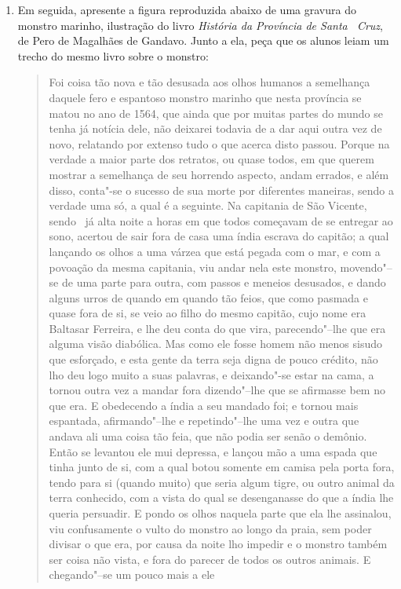 \documentclass[12pt]{extarticle}
\begin{document}
{\begin{enumerate}
\item Em seguida, apresente a figura reproduzida abaixo de uma gravura do 
monstro marinho, ilustração do livro \emph{História da Província de Santa~
Cruz}, de Pero de Magalhães de Gandavo. Junto a ela, peça que os alunos 
leiam um trecho do mesmo livro sobre o monstro:
\begin{quote} Foi coisa tão nova e tão desusada aos olhos humanos a 
semelhança daquele fero e espantoso monstro marinho que nesta província 
se matou no ano de 1564, que ainda que por muitas partes do mundo se 
tenha já notícia dele, não deixarei todavia de a dar aqui outra vez de 
novo, relatando por extenso tudo o que acerca disto passou. Porque na 
verdade a maior parte dos retratos, ou quase todos, em que querem mostrar 
a semelhança de seu horrendo aspecto, andam errados, e além disso,
conta"-se o sucesso de sua morte por diferentes maneiras, sendo a
verdade uma só, a qual é a seguinte. Na capitania de São Vicente, sendo				\
já alta noite a horas em que todos começavam de se entregar ao sono,
acertou de sair fora de casa uma índia escrava do capitão; a qual
lançando os olhos a uma várzea que está pegada com o mar, e com a
povoação da mesma capitania, viu andar nela este monstro, movendo"--se de
uma parte para outra, com passos e meneios desusados, e dando alguns urros
de quando em quando tão feios, que como pasmada e quase fora de si, se
veio ao filho do mesmo capitão, cujo nome era Baltasar Ferreira, e lhe
deu conta do que vira, parecendo"--lhe que era alguma visão diabólica.
Mas como ele fosse homem não menos sisudo que esforçado, e esta gente
da terra seja digna de pouco crédito, não lho deu logo muito a suas
palavras, e deixando"-se estar na cama, a tornou outra vez a mandar
fora dizendo"--lhe que se afirmasse bem no que era. E obedecendo a índia
a seu mandado foi; e tornou mais espantada, afirmando"--lhe e
repetindo"--lhe uma vez e outra que andava ali uma coisa tão feia, que não
podia ser senão o demônio. Então se levantou ele mui depressa, e
lançou mão a uma espada que tinha junto de si, com a qual botou somente
em camisa pela porta fora, tendo para si (quando muito) que seria algum
tigre, ou outro animal da terra conhecido, com a vista do qual se
desenganasse do que a índia lhe queria persuadir. E pondo os olhos
naquela parte que ela lhe assinalou, viu confusamente o vulto do
monstro ao longo da praia, sem poder divisar o que era, por causa da
noite lho impedir e o monstro também ser coisa não vista, e fora do
parecer de todos os outros animais. E chegando"--se um pouco mais a ele

\end{quote}
\end{enumerate}}
\end{document}
